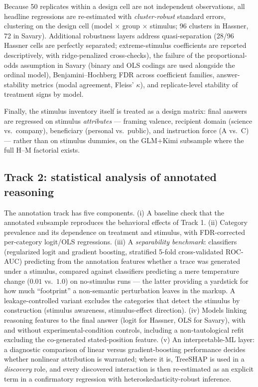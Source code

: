 \documentclass[14pt,a4paper]{extarticle}
\begin{document}
Because 50 replicates within a design cell are not independent observations, all headline regressions are re-estimated with \emph{cluster-robust} standard errors, clustering on the design cell (model $\times$ group $\times$ stimulus; 96 clusters in Hassner, 72 in Savary). Additional robustness layers address quasi-separation (28/96 Hassner cells are perfectly separated; extreme-stimulus coefficients are reported descriptively, with ridge-penalized cross-checks), the failure of the proportional-odds assumption in Savary (binary and OLS codings are used alongside the ordinal model), Benjamini--Hochberg FDR across coefficient families, answer-stability metrics (modal agreement, Fleiss' $\kappa$), and replicate-level stability of treatment signs by model.

Finally, the stimulus inventory itself is treated as a design matrix: final answers are regressed on stimulus \emph{attributes} --- framing valence, recipient domain (science vs.\ company), beneficiary (personal vs.\ public), and instruction force (A vs.\ C) --- rather than on stimulus dummies, on the GLM+Kimi subsample where the full H--M factorial exists.

\subsection{Track 2: statistical analysis of annotated reasoning}

The annotation track has five components. (i) A baseline check that the annotated subsample reproduces the behavioral effects of Track 1. (ii) Category prevalence and its dependence on treatment and stimulus, with FDR-corrected per-category logit/OLS regressions. (iii) A \emph{separability benchmark}: classifiers (regularized logit and gradient boosting, stratified 5-fold cross-validated ROC-AUC) predicting from the annotation features whether a trace was generated under a stimulus, compared against classifiers predicting a mere temperature change ($0.01$ vs.\ $1.0$) on no-stimulus runs --- the latter providing a yardstick for how much ``footprint'' a non-semantic perturbation leaves in the markup. A leakage-controlled variant excludes the categories that detect the stimulus by construction (stimulus awareness, stimulus-effect direction). (iv) Models linking reasoning features to the final answer (logit for Hassner, OLS for Savary), with and without experimental-condition controls, including a non-tautological refit excluding the co-generated stated-position feature. (v) An interpretable-ML layer: a diagnostic comparison of linear versus gradient-boosting performance decides whether nonlinear attribution is warranted; where it is, TreeSHAP \cite{lundberg2017} is used in a \emph{discovery} role, and every discovered interaction is then re-estimated as an explicit term in a confirmatory regression with heteroskedasticity-robust inference.
\end{document}
